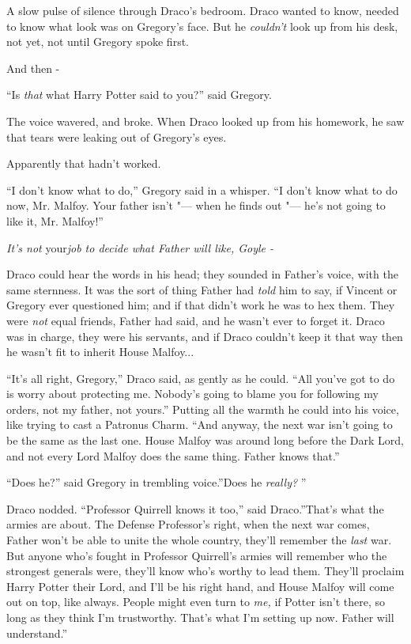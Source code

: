 A slow pulse of silence through Draco's bedroom. Draco wanted to know,
needed to know what look was on Gregory's face. But he \emph{couldn't}
look up from his desk, not yet, not until Gregory spoke first.

And then -

``Is \emph{that} what Harry Potter said to you?'' said Gregory.

The voice wavered, and broke. When Draco looked up from his homework, he
saw that tears were leaking out of Gregory's eyes.

Apparently that hadn't worked.

``I don't know what to do,'' Gregory said in a whisper. ``I don't know
what to do now, Mr. Malfoy. Your father isn't "--- when he finds out "--- he's
not going to like it, Mr. Malfoy!''

\emph{It's not} your\emph{job to decide what Father will like, Goyle -}

Draco could hear the words in his head; they sounded in Father's voice,
with the same sternness. It was the sort of thing Father had \emph{told}
him to say, if Vincent or Gregory ever questioned him; and if that
didn't work he was to hex them. They were \emph{not} equal friends,
Father had said, and he wasn't ever to forget it. Draco was in charge,
they were his servants, and if Draco couldn't keep it that way then he
wasn't fit to inherit House Malfoy...

``It's all right, Gregory,'' Draco said, as gently as he could. ``All
you've got to do is worry about protecting me. Nobody's going to blame
you for following my orders, not my father, not yours.'' Putting all the
warmth he could into his voice, like trying to cast a Patronus Charm.
``And anyway, the next war isn't going to be the same as the last one.
House Malfoy was around long before the Dark Lord, and not every Lord
Malfoy does the same thing. Father knows that.''

``Does he?'' said Gregory in trembling voice.''Does he \emph{really?} ''

Draco nodded. ``Professor Quirrell knows it too,'' said Draco.''That's
what the armies are about. The Defense Professor's right, when the next
war comes, Father won't be able to unite the whole country, they'll
remember the \emph{last} war. But anyone who's fought in Professor
Quirrell's armies will remember who the strongest generals were, they'll
know who's worthy to lead them. They'll proclaim Harry Potter their
Lord, and I'll be his right hand, and House Malfoy will come out on top,
like always. People might even turn to \emph{me,} if Potter isn't there,
so long as they think I'm trustworthy. That's what I'm setting up now.
Father will understand.''

